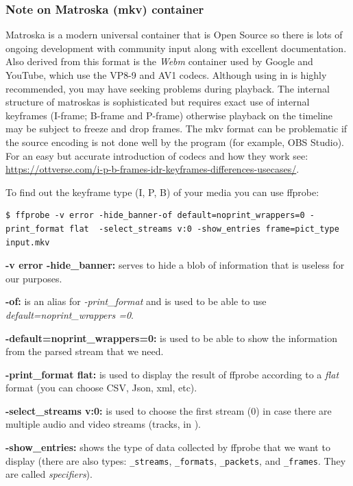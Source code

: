 \subsubsection{Note on Matroska (mkv) container}
\label{ssub:note_mkv_container}

Matroska is a modern universal container that is Open Source so there is lots of ongoing development with community input along with excellent documentation.  Also derived from this format is the \textit{Webm} container used by Google and YouTube, which use the VP8-9 and AV1 codecs. Although using in \CGG{} is highly recommended, you may have seeking problems during playback. The internal structure of matroskas is sophisticated but requires exact use of internal keyframes (I-frame; B-frame and P-frame) otherwise playback on the timeline may be subject to freeze and drop frames. The mkv format can be problematic if the source encoding is not done well by the program (for example, OBS Studio). For an easy but accurate introduction of codecs and how they work see: {\small\url{https://ottverse.com/i-p-b-frames-idr-keyframes-differences-usecases/}}.

To find out the keyframe type (I, P, B) of your media you can use ffprobe:

\begin{lstlisting}[numbers=none]
	$ ffprobe -v error -hide_banner-of default=noprint_wrappers=0 -print_format flat  -select_streams v:0 -show_entries frame=pict_type input.mkv
\end{lstlisting}

\textbf{-v error -hide\_banner:} serves to hide a blob of information that is useless for our purposes.

\textbf{-of:} is an alias for \textit{-print\_format} and is used to be able to use \textit{default=noprint\_wrappers =0}.

\textbf{-default=noprint\_wrappers=0:} is used to be able to show the information from the parsed stream that we need.

\textbf{-print\_format flat:} is used to display the result of ffprobe according to a \textit{flat} format (you can choose CSV, Json, xml, etc).

\textbf{-select\_streams v:0:} is used to choose the first stream (0) in case there are multiple audio and video streams (tracks, in \CGG{}).

\textbf{-show\_entries:} shows the type of data collected by ffprobe that we want to display (there are also types: \texttt{\_streams}, \texttt{\_formats}, \texttt{\_packets}, and \texttt{\_frames}. They are called \textit{specifiers}).

